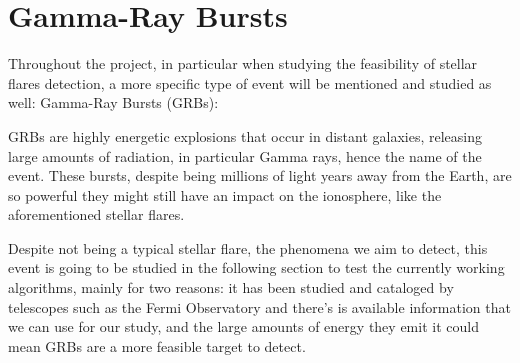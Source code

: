 \section{Gamma-Ray Bursts}

Throughout the project, in particular when studying the feasibility of stellar flares detection, a more specific type of event will be mentioned and studied as well: Gamma-Ray Bursts (GRBs):

GRBs are highly energetic explosions that occur in distant galaxies, releasing large amounts of radiation, in particular Gamma rays, hence the name of the event. These bursts, despite being millions of light years away from the Earth, are so powerful they might still have an impact on the ionosphere, like the aforementioned stellar flares. 

Despite not being a typical stellar flare, the phenomena we aim to detect, this event is going to be studied in the following section to test the currently working algorithms, mainly for two reasons: it has been studied and cataloged by telescopes such as the Fermi Observatory and there’s is available information that we can use for our study, and the large amounts of energy they emit it could mean GRBs are a more feasible target to detect.
